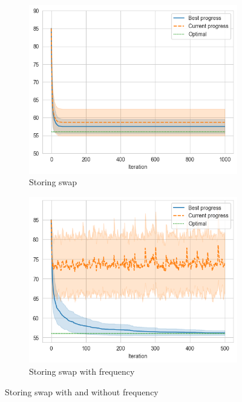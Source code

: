 \begin{figure}[ht]
    \hfill
    \begin{subfigure}{0.48\textwidth}
        \centering
        \includegraphics[width=\textwidth]{../images/p4/store-pair.png}
        \caption{Storing swap}
    \end{subfigure}
    \hfill
    \begin{subfigure}{0.48\textwidth}
        \centering
        \includegraphics[width=\textwidth]{../images/p4/store-freq-base.png}
        \caption{Storing swap with frequency}
    \end{subfigure}
    \hfill
    \caption{Storing swap with and without frequency}
    \label{fig:p4-freq}
\end{figure}

